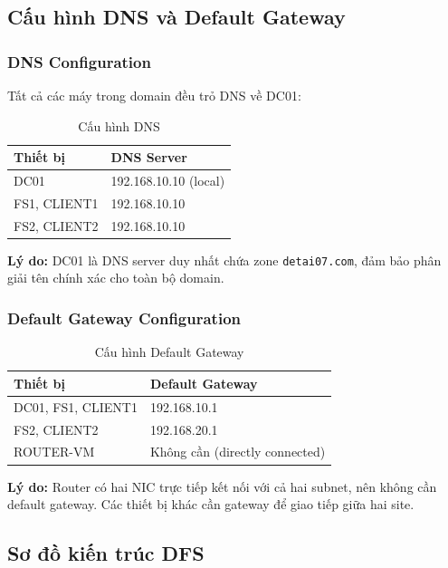 \subsection{Cấu hình DNS và Default Gateway}

\subsubsection{DNS Configuration}

Tất cả các máy trong domain đều trỏ DNS về DC01:

\begin{table}[H]
\centering
\begin{tabular}{|l|l|}
\hline
\textbf{Thiết bị} & \textbf{DNS Server} \\ \hline
DC01 & 192.168.10.10 (local) \\ \hline
FS1, CLIENT1 & 192.168.10.10 \\ \hline
FS2, CLIENT2 & 192.168.10.10 \\ \hline
\end{tabular}
\caption{Cấu hình DNS}
\end{table}

\textbf{Lý do:} DC01 là DNS server duy nhất chứa zone \texttt{detai07.com}, đảm bảo phân giải tên chính xác cho toàn bộ domain.

\subsubsection{Default Gateway Configuration}

\begin{table}[h]
\centering
\begin{tabular}{|l|l|}
\hline
\textbf{Thiết bị} & \textbf{Default Gateway} \\ \hline
DC01, FS1, CLIENT1 & 192.168.10.1 \\ \hline
FS2, CLIENT2 & 192.168.20.1 \\ \hline
ROUTER-VM & Không cần (directly connected) \\ \hline
\end{tabular}
\caption{Cấu hình Default Gateway}
\end{table}

\textbf{Lý do:} Router có hai NIC trực tiếp kết nối với cả hai subnet, nên không cần default gateway. Các thiết bị khác cần gateway để giao tiếp giữa hai site.

\subsection{Sơ đồ kiến trúc DFS}

